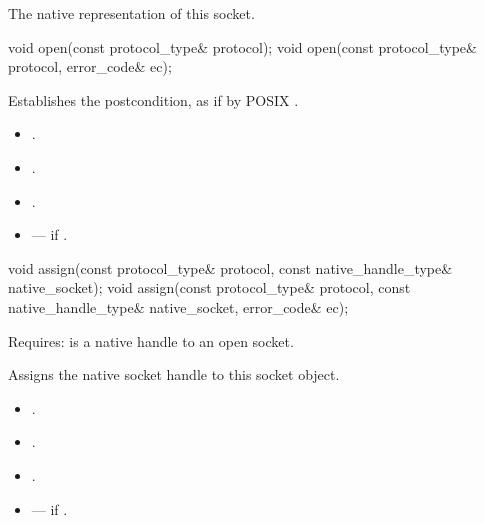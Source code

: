\begin{itemdescr}
\pnum
\returns The native representation of this socket.
\end{itemdescr}

\begin{itemdecl}
void open(const protocol_type& protocol);
void open(const protocol_type& protocol, error_code& ec);
\end{itemdecl}

\begin{itemdescr}
\pnum
\effects Establishes the postcondition, as if by POSIX .

\pnum
\postconditions 
\begin{itemize}
\item
{}.
\item
{}.
\item
{}.
\end{itemize}

\pnum
\errors
\begin{itemize}
\item
{} --- if .
\end{itemize}
\end{itemdescr}

\begin{itemdecl}
void assign(const protocol_type& protocol,
            const native_handle_type& native_socket);
void assign(const protocol_type& protocol,
            const native_handle_type& native_socket, error_code& ec);
\end{itemdecl}

\begin{itemdescr}
\pnum
Requires:  is a native handle to an open socket.

\pnum
\effects Assigns the native socket handle to this socket object.

\pnum
\postconditions 
\begin{itemize}
\item
{}.
\item
{}.
\item
{}.
\end{itemize}

\pnum
\errors
\begin{itemize}
\item
{} --- if .
\end{itemize}
\end{itemdescr}

